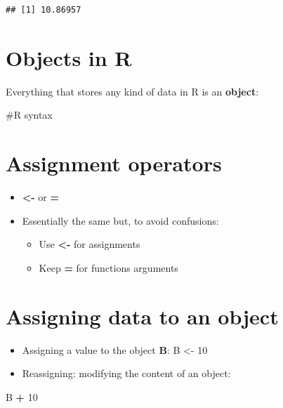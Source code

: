 \documentclass[]{book}
\newenvironment{Shaded}{\begin{snugshade}}{\end{snugshade}}
\newcommand{\DecValTok}[1]{\textcolor[rgb]{0.00,0.00,0.81}{#1}}
\newcommand{\NormalTok}[1]{#1}
\newcommand{\OperatorTok}[1]{\textcolor[rgb]{0.81,0.36,0.00}{\textbf{#1}}}
\newcommand{\StringTok}[1]{\textcolor[rgb]{0.31,0.60,0.02}{#1}}
\providecommand{\tightlist}{%
  \setlength{\itemsep}{0pt}\setlength{\parskip}{0pt}}
\begin{document}
\begin{verbatim}
## [1] 10.86957
\end{verbatim}

\hypertarget{objects-in-r}{%
\section{Objects in R}\label{objects-in-r}}

Everything that stores any kind of data in R is an \textbf{object}:

\#R syntax

\hypertarget{assignment-operators}{%
\section{Assignment operators}\label{assignment-operators}}

\begin{itemize}
\tightlist
\item
  \textbf{\textless{}-} or \textbf{=}
\item
  Essentially the same but, to avoid confusions:

  \begin{itemize}
  \tightlist
  \item
    Use \textbf{\textless{}-} for assignments
  \item
    Keep \textbf{=} for functions arguments
  \end{itemize}
\end{itemize}

\hypertarget{assigning-data-to-an-object}{%
\section{Assigning data to an object}\label{assigning-data-to-an-object}}

\begin{itemize}
\item
  Assigning a value to the object \textbf{B}:
  B \textless{}- 10
\item
  Reassigning: modifying the content of an object:
\end{itemize}

\begin{Shaded}
\begin{Highlighting}[]
\NormalTok{B }\OperatorTok{+}\StringTok{ }\DecValTok{10}
\end{Highlighting}
\end{Shaded}
\end{document}
